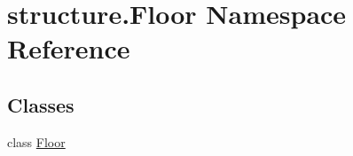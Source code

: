 \hypertarget{namespacestructure_1_1_floor}{\section{structure.\-Floor Namespace Reference}
\label{namespacestructure_1_1_floor}
}
\subsection*{Classes}
\begin{DoxyCompactItemize}
\item 
class \hyperlink{classstructure_1_1_floor_1_1_floor}{Floor}
\end{DoxyCompactItemize}
